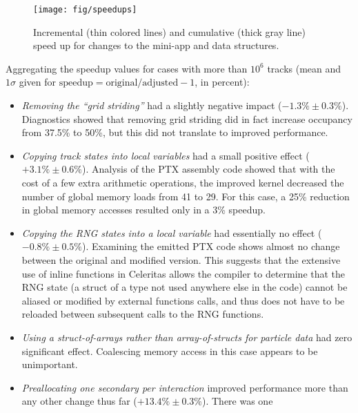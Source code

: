 \documentclass{webofc}
\begin{document}
\begin{figure}[htb]
  \centering
  \texttt{[image: fig/speedups]}
  \caption{Incremental (thin colored lines) and cumulative (thick gray line)
  speed up for changes to the mini-app and data structures.}
  \label{fig:speedup}
\end{figure}


Aggregating the speedup values for cases with more than $10^6$ tracks (mean and
$1\sigma$ given for $\mbox{speedup}=\mbox{original}/\mbox{adjusted} - 1$, in
percent):
\begin{itemize}
  \item \emph{Removing the ``grid striding''} had a slightly negative impact
    ($-1.3\% \pm 0.3\%$). Diagnostics showed
    that removing grid striding did in fact increase occupancy from 37.5\% to
    50\%, but this did not translate to improved performance.
  \item \emph{Copying track states into local variables} had a small positive
    effect ($+3.1\% \pm 0.6\%$). Analysis of the PTX assembly code showed that
    with the cost of a few extra arithmetic operations, the improved kernel
    decreased the number of global memory loads from 41 to 29. For this case, a
    25\% reduction in global memory accesses resulted only in a 3\% speedup.
  \item \emph{Copying the RNG states into a local variable} had essentially no effect
    ($-0.8\% \pm 0.5\%$). Examining the emitted PTX code shows almost no change
    between the original and modified version. This suggests that the extensive
    use of inline functions in Celeritas allows the compiler to determine that
    the RNG state (a struct of a type not used anywhere else in the code) cannot
    be aliased or modified by external functions calls, and thus does not have
    to be reloaded between subsequent calls to the RNG functions.
  \item \emph{Using a struct-of-arrays rather than array-of-structs for particle
    data} had zero significant effect. Coalescing memory access in this case
    appears to be unimportant.
  \item \emph{Preallocating one secondary per interaction} improved performance
    more than any other change thus far ($+13.4\% \pm 0.3\%$). There was one

\end{itemize}
\end{document}

